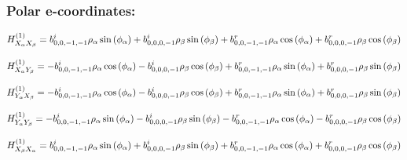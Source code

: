 \documentclass[fleqn]{article}
\begin{document}
\subsubsection*{Polar e-coordinates:}

\begin{dmath*}
H_{X_{\alpha}X_{\beta}}^{(1)}=b^{i}_{0,0,-1,-1} \rho_{\alpha} \sin{\left (\phi_{\alpha} \right )} + b^{i}_{0,0,0,-1} \rho_{\beta} \sin{\left (\phi_{\beta} \right )} + b^{r}_{0,0,-1,-1} \rho_{\alpha} \cos{\left (\phi_{\alpha} \right )} + b^{r}_{0,0,0,-1} \rho_{\beta} \cos{\left (\phi_{\beta} \right )}\\
\end{dmath*}

\begin{dmath*}
H_{X_{\alpha}Y_{\beta}}^{(1)}=-  b^{i}_{0,0,-1,-1} \rho_{\alpha} \cos{\left (\phi_{\alpha} \right )} -  b^{i}_{0,0,0,-1} \rho_{\beta} \cos{\left (\phi_{\beta} \right )} +  b^{r}_{0,0,-1,-1} \rho_{\alpha} \sin{\left (\phi_{\alpha} \right )} +  b^{r}_{0,0,0,-1} \rho_{\beta} \sin{\left (\phi_{\beta} \right )}\\
\end{dmath*}

\begin{dmath*}
H_{Y_{\alpha}X_{\beta}}^{(1)}=-  b^{i}_{0,0,-1,-1} \rho_{\alpha} \cos{\left (\phi_{\alpha} \right )} -  b^{i}_{0,0,0,-1} \rho_{\beta} \cos{\left (\phi_{\beta} \right )} +  b^{r}_{0,0,-1,-1} \rho_{\alpha} \sin{\left (\phi_{\alpha} \right )} +  b^{r}_{0,0,0,-1} \rho_{\beta} \sin{\left (\phi_{\beta} \right )}\\
\end{dmath*}

\begin{dmath*}
H_{Y_{\alpha}Y_{\beta}}^{(1)}=-  b^{i}_{0,0,-1,-1} \rho_{\alpha} \sin{\left (\phi_{\alpha} \right )} -  b^{i}_{0,0,0,-1} \rho_{\beta} \sin{\left (\phi_{\beta} \right )} -  b^{r}_{0,0,-1,-1} \rho_{\alpha} \cos{\left (\phi_{\alpha} \right )} -  b^{r}_{0,0,0,-1} \rho_{\beta} \cos{\left (\phi_{\beta} \right )}\\
\end{dmath*}

\begin{dmath*}
H_{X_{\beta}X_{\alpha}}^{(1)}=b^{i}_{0,0,-1,-1} \rho_{\alpha} \sin{\left (\phi_{\alpha} \right )} + b^{i}_{0,0,0,-1} \rho_{\beta} \sin{\left (\phi_{\beta} \right )} + b^{r}_{0,0,-1,-1} \rho_{\alpha} \cos{\left (\phi_{\alpha} \right )} + b^{r}_{0,0,0,-1} \rho_{\beta} \cos{\left (\phi_{\beta} \right )}\\
\end{dmath*}
\end{document}
